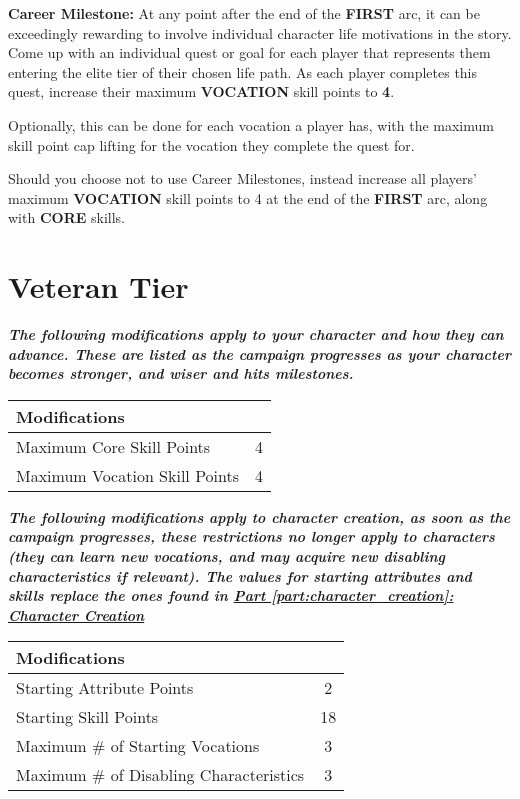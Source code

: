 \textbf{Career Milestone:} At any point after the end of the \textbf{FIRST} arc, it can be exceedingly rewarding to involve individual character life motivations in the story. Come up with an individual quest or goal for each player that represents them entering the elite tier of their chosen life path. As each player completes this quest, increase their maximum \textbf{VOCATION} skill points to \textbf{4}.

Optionally, this can be done for each vocation a player has, with the maximum skill point cap lifting for the vocation they complete the quest for.

Should you choose not to use Career Milestones, instead increase all players' maximum \textbf{VOCATION} skill points to 4 at the end of the \textbf{FIRST} arc, along with \textbf{CORE} skills.

\section{Veteran Tier}

\textbf{\textit{The following modifications apply to your character and how they can advance. These are listed as the campaign progresses as your character becomes stronger, and wiser and hits milestones.}}

\begin{center}
    \begin{xltabular}{\textwidth}{|l c|} 
        \hline 
        \textbf{Modifications} &  \\
        \hline
        Maximum Core Skill Points & 4 \\
        Maximum Vocation Skill Points & 4 \\
        \hline
    \end{xltabular}
\end{center}

\textbf{\textit{The following modifications apply to character creation, as soon as the campaign progresses, these restrictions no longer apply to characters (they can learn new vocations, and may acquire new disabling characteristics if relevant). The values for starting attributes and skills replace the ones found in \hyperref[part:character_creation]{Part \ref{part:character_creation}: Character Creation}}}

\begin{center}
    \begin{xltabular}{\textwidth}{|l c|} 
        \hline 
        \textbf{Modifications} &  \\
        \hline
        Starting Attribute Points & 2 \\
        Starting Skill Points & 18 \\ 
        Maximum \# of Starting Vocations & 3 \\
        Maximum \# of Disabling Characteristics & 3 \\
        \hline
    \end{xltabular}
\end{center}

